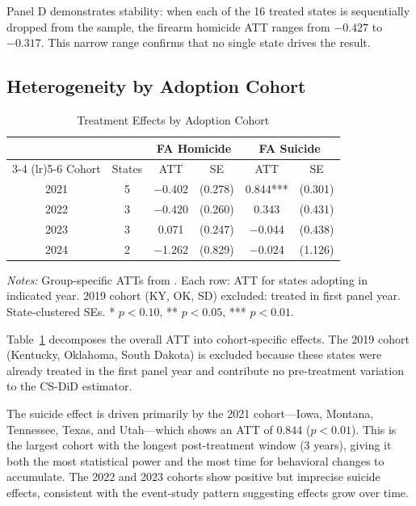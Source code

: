 \documentclass[12pt]{article}
\begin{document}
Panel D demonstrates stability: when each of the 16 treated states is sequentially dropped from the sample, the firearm homicide ATT ranges from $-0.427$ to $-0.317$. This narrow range confirms that no single state drives the result.

\subsection{Heterogeneity by Adoption Cohort}

\begin{table}[H]
\centering
\caption{Treatment Effects by Adoption Cohort}
\begin{threeparttable}
\begin{tabular}{cccccc}
\toprule
& & \multicolumn{2}{c}{FA Homicide} & \multicolumn{2}{c}{FA Suicide} \\
\cmidrule(lr){3-4} \cmidrule(lr){5-6}
Cohort & States & ATT & SE & ATT & SE \\
\midrule
2021 & 5 & $-$0.402 & (0.278) & 0.844*** & (0.301) \\
2022 & 3 & $-$0.420 & (0.260) & 0.343 & (0.431) \\
2023 & 3 & 0.071 & (0.247) & $-$0.044 & (0.438) \\
2024 & 2 & $-$1.262 & (0.829) & $-$0.024 & (1.126) \\
\bottomrule
\end{tabular}
\begin{tablenotes}[flushleft]
\small
\item \textit{Notes:} Group-specific ATTs from \citet{callaway2021}. Each row: ATT for states adopting in indicated year. 2019 cohort (KY, OK, SD) excluded: treated in first panel year. State-clustered SEs. * $p<0.10$, ** $p<0.05$, *** $p<0.01$.
\end{tablenotes}
\end{threeparttable}
\label{tab:heterogeneity}
\end{table}

Table~\ref{tab:heterogeneity} decomposes the overall ATT into cohort-specific effects. The 2019 cohort (Kentucky, Oklahoma, South Dakota) is excluded because these states were already treated in the first panel year and contribute no pre-treatment variation to the CS-DiD estimator.

The suicide effect is driven primarily by the 2021 cohort---Iowa, Montana, Tennessee, Texas, and Utah---which shows an ATT of 0.844 ($p < 0.01$). This is the largest cohort with the longest post-treatment window (3 years), giving it both the most statistical power and the most time for behavioral changes to accumulate. The 2022 and 2023 cohorts show positive but imprecise suicide effects, consistent with the event-study pattern suggesting effects grow over time.
\end{document}
